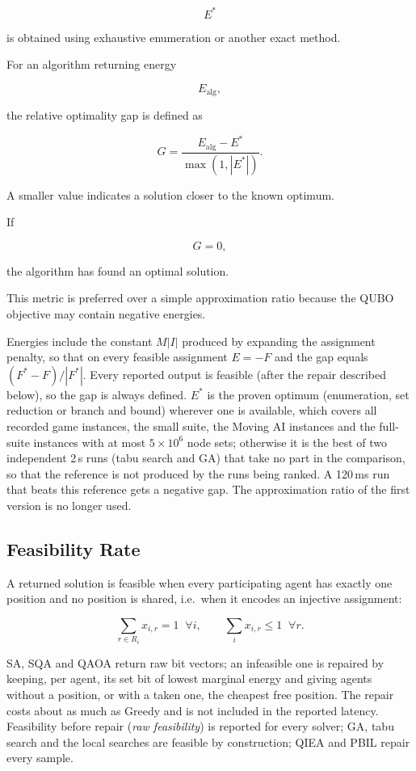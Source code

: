 \documentclass[12pt, a4paper]{article}
\begin{document}
$$
E^*
$$

is obtained using exhaustive enumeration or another exact method.

For an algorithm returning energy

$$
E_{\text{alg}},
$$

the relative optimality gap is defined as

$$
G
=
\frac{E_{\text{alg}}-E^*}
{\max(1,|E^*|)}.
$$

A smaller value indicates a solution closer to the known optimum.

If

$$
G=0,
$$

the algorithm has found an optimal solution.

This metric is preferred over a simple approximation ratio because the QUBO objective may contain negative energies.

Energies include the constant $M|I|$ produced by expanding the assignment penalty, so that on every feasible assignment $E=-F$ and the gap equals $(F^*-F)/|F^*|$. Every reported output is feasible (after the repair described below), so the gap is always defined. $E^*$ is the proven optimum (enumeration, set reduction or branch and bound) wherever one is available, which covers all recorded game instances, the small suite, the Moving AI instances and the full-suite instances with at most $5\times10^6$ node sets; otherwise it is the best of two independent 2\,s runs (tabu search and GA) that take no part in the comparison, so that the reference is not produced by the runs being ranked. A 120\,ms run that beats this reference gets a negative gap. The approximation ratio of the first version is no longer used.

\subsection*{Feasibility Rate}

A returned solution is feasible when every participating agent has exactly one position and no position is shared, i.e.\ when it encodes an injective assignment:

$$
\sum_{r\in R_i}x_{i,r}=1\;\;\forall i, \qquad \sum_{i}x_{i,r}\le 1\;\;\forall r .
$$

SA, SQA and QAOA return raw bit vectors; an infeasible one is repaired by keeping, per agent, its set bit of lowest marginal energy and giving agents without a position, or with a taken one, the cheapest free position. The repair costs about as much as Greedy and is not included in the reported latency. Feasibility before repair (\emph{raw feasibility}) is reported for every solver; GA, tabu search and the local searches are feasible by construction; QIEA and PBIL repair every sample.
\end{document}
